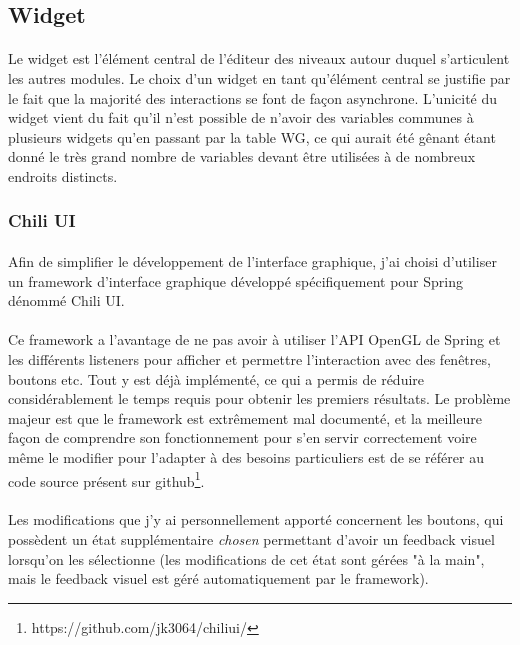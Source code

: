 \documentclass[a4paper]{article}
\begin{document}
\subsection{Widget}
\paragraph{}
Le widget est l'élément central de l'éditeur des niveaux autour duquel s'articulent les autres modules. Le choix d'un widget en tant qu'élément central se justifie par le fait que la majorité des interactions se font de façon asynchrone. L'unicité du widget vient du fait qu'il n'est possible de n'avoir des variables communes à plusieurs widgets qu'en passant par la table WG, ce qui aurait été gênant étant donné le très grand nombre de variables devant être utilisées à de nombreux endroits distincts.
\subsubsection{Chili UI}
\paragraph{}
Afin de simplifier le développement de l'interface graphique, j'ai choisi d'utiliser un framework d'interface graphique développé spécifiquement pour Spring dénommé Chili UI. 
\paragraph{}
Ce framework a l'avantage de ne pas avoir à utiliser l'API OpenGL de Spring et les différents listeners pour afficher et permettre l'interaction avec des fenêtres, boutons etc. Tout y est déjà implémenté, ce qui a permis de réduire considérablement le temps requis pour obtenir les premiers résultats. Le problème majeur est que le framework est extrêmement mal documenté, et la meilleure façon de comprendre son fonctionnement pour s'en servir correctement voire même le modifier pour l'adapter à des besoins particuliers est de se référer au code source présent sur github\footnote{https://github.com/jk3064/chiliui/}.
\paragraph{}
Les modifications que j'y ai personnellement apporté concernent les boutons, qui possèdent un état supplémentaire \textit{chosen} permettant d'avoir un feedback visuel lorsqu'on les sélectionne (les modifications de cet état sont gérées "à la main", mais le feedback visuel est géré automatiquement par le framework).
\end{document}
